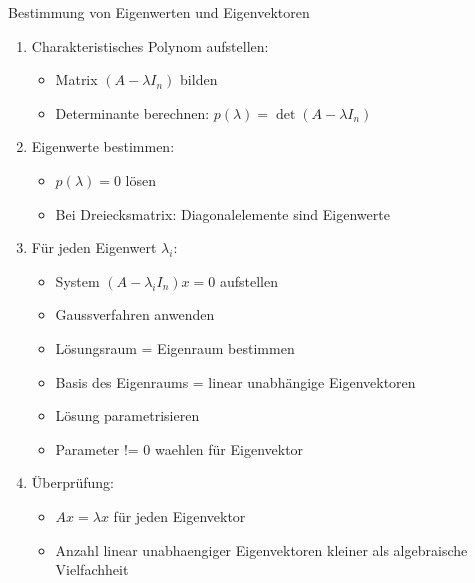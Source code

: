 \begin{KR}{Bestimmung von Eigenwerten und Eigenvektoren}
\begin{enumerate}
    \item Charakteristisches Polynom aufstellen: 
    \begin{itemize}
        \item Matrix $(A-\lambda I_n)$ bilden
        \item Determinante berechnen: $p(\lambda) = \det(A-\lambda I_n)$
    \end{itemize}
    \item Eigenwerte bestimmen:
    \begin{itemize}
        \item $p(\lambda) = 0$ lösen
        \item Bei Dreiecksmatrix: Diagonalelemente sind Eigenwerte
    \end{itemize}
    \item Für jeden Eigenwert $\lambda_i$:
    \begin{itemize}
        \item System $(A-\lambda_i I_n)x = 0$ aufstellen
        \item Gaussverfahren anwenden 
        \item Lösungsraum = Eigenraum bestimmen
        \item Basis des Eigenraums = linear unabhängige Eigenvektoren
        \item Lösung parametrisieren
        \item Parameter != 0 waehlen für Eigenvektor
    \end{itemize}
    \item Überprüfung:
    \begin{itemize}
        \item $Ax = \lambda x$ für jeden Eigenvektor
        \item Anzahl linear unabhaengiger Eigenvektoren kleiner als algebraische Vielfachheit
    \end{itemize}
\end{enumerate}
\end{KR}

